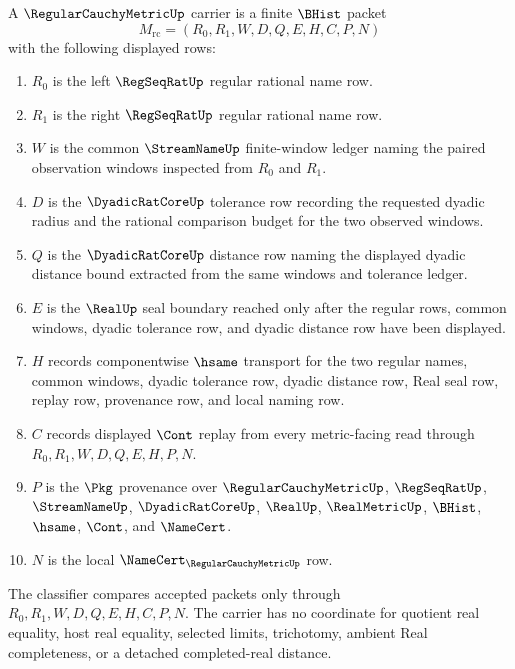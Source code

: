 \begin{definition}
\label{def:regular-cauchy-metric-carrier}
A $\RegularCauchyMetricUp$ carrier is a finite $\BHist$ packet
$$
M_{\mathrm{rc}}=(R_0,R_1,W,D,Q,E,H,C,P,N)
$$
with the following displayed rows:
\begin{enumerate}
\item $R_0$ is the left $\RegSeqRatUp$ regular rational name row.
\item $R_1$ is the right $\RegSeqRatUp$ regular rational name row.
\item $W$ is the common $\StreamNameUp$ finite-window ledger naming the paired observation windows inspected from $R_0$ and $R_1$.
\item $D$ is the $\DyadicRatCoreUp$ tolerance row recording the requested dyadic radius and the rational comparison budget for the two observed windows.
\item $Q$ is the $\DyadicRatCoreUp$ distance row naming the displayed dyadic distance bound extracted from the same windows and tolerance ledger.
\item $E$ is the $\RealUp$ seal boundary reached only after the regular rows, common windows, dyadic tolerance row, and dyadic distance row have been displayed.
\item $H$ records componentwise $\hsame$ transport for the two regular names, common windows, dyadic tolerance row, dyadic distance row, Real seal row, replay row, provenance row, and local naming row.
\item $C$ records displayed $\Cont$ replay from every metric-facing read through $R_0,R_1,W,D,Q,E,H,P,N$.
\item $P$ is the $\Pkg$ provenance over $\RegularCauchyMetricUp$, $\RegSeqRatUp$, $\StreamNameUp$, $\DyadicRatCoreUp$, $\RealUp$, $\RealMetricUp$, $\BHist$, $\hsame$, $\Cont$, and $\NameCert$.
\item $N$ is the local $\NameCert_{\RegularCauchyMetricUp}$ row.
\end{enumerate}
The classifier compares accepted packets only through $R_0,R_1,W,D,Q,E,H,C,P,N$. The carrier has no coordinate for quotient real equality, host real equality, selected limits, trichotomy, ambient Real completeness, or a detached completed-real distance.
\end{definition}

